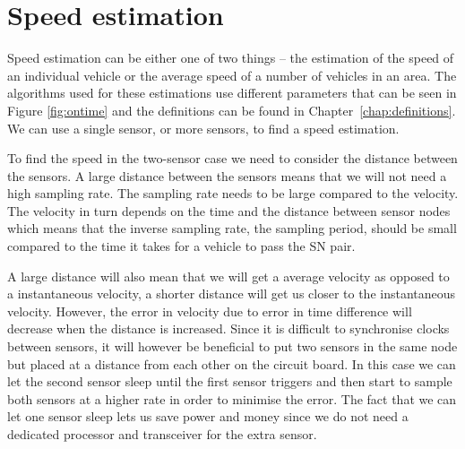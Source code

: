 \section{Speed estimation}

Speed estimation can be either one of two things -- the estimation of the speed of an individual vehicle or the average speed of a number of vehicles in an area. The algorithms used for these estimations use different parameters that can be seen in Figure \ref{fig:ontime} and the definitions can be found in Chapter~\ref{chap:definitions}. We can use a single sensor, or more sensors, to find a speed estimation.

To find the speed in the two-sensor case we need to consider the distance between the sensors. A large distance between the sensors means that we will not need a high sampling rate. The sampling rate needs to be large compared to the velocity. The velocity in turn depends on the time and the distance between sensor nodes which means that the inverse sampling rate, the sampling period, should be small compared to the time it takes for a vehicle to pass the SN pair.

A large distance will also mean that we will get a average velocity as opposed to a instantaneous velocity, a shorter distance will get us closer to the instantaneous velocity. However, the error in velocity due to error in time difference will decrease when the distance is increased. Since it is difficult to synchronise clocks between sensors, it will however be beneficial to put two sensors in the same node but placed at a distance from each other on the circuit board. In this case we can let the second sensor sleep until the first sensor triggers and then start to sample both sensors at a higher rate in order to minimise the error. The fact that we can let one sensor sleep lets us save power and money since we do not need a dedicated processor and transceiver for the extra sensor.

